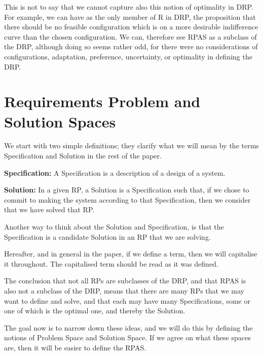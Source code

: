 \documentclass[graybox]{svmult}
\newcommand{\xb}[1]{\textbf{#1}}
\newcommand{\RP}{RP}
\newcommand{\RPAS}{RPAS}
\newcommand{\ZJRP}{DRP}
\newcommand{\SolutionSpace}{Solution Space}
\newcommand{\ProblemSpace}{Problem Space}
\newcommand{\Specification}{Specification}
\newcommand{\Solution}{Solution}
\begin{document}
This is not to say that we cannot capture also this notion of optimality in \ZJRP. For example, we can have as the only member of R in \ZJRP, the proposition that there should be no feasible configuration which is on a more desirable indifference curve than the chosen configuration. We can, therefore see \RPAS{} as a subclass of the \ZJRP, although doing so seems rather odd, for there were no considerations of configurations, adaptation, preference, uncertainty, or optimality in defining the \ZJRP. 



%
\section{Requirements Problem and Solution Spaces}\label{s:spaces}
We start with two simple definitions; they clarify what we will mean by the terms \Specification{} and \Solution{} in the rest of the paper. 

\begin{definition}\label{d:specification}
\xb{\Specification:} A Specification is a description of a design of a system.
\end{definition}

\begin{definition}\label{d:solution}
\xb{\Solution:} In a given \RP, a \Solution{} is a \Specification{} such that, if we chose to commit to making the system according to that \Specification, then we consider that we have solved that \RP.
\end{definition}

Another way to think about the Solution and Specification, is that the Specification is a candidate Solution in an RP that we are solving.

Hereafter, and in general in the paper, if we define a term, then we will capitalise it throughout. The capitalised term should be read as it was defined.

The conclusion that not all \RP s are subclasses of the \ZJRP, and that \RPAS{} is also not a subclass of the \ZJRP, means that there are many \RP s that we may want to define and solve, and that each may have many \Specification s, some or one of which is the optimal one, and thereby the \Solution.

The goal now is to narrow down these ideas, and we will do this by defining the notions of \ProblemSpace{} and \SolutionSpace. If we agree on what these spaces are, then it will be easier to define the \RPAS.
\end{document}
